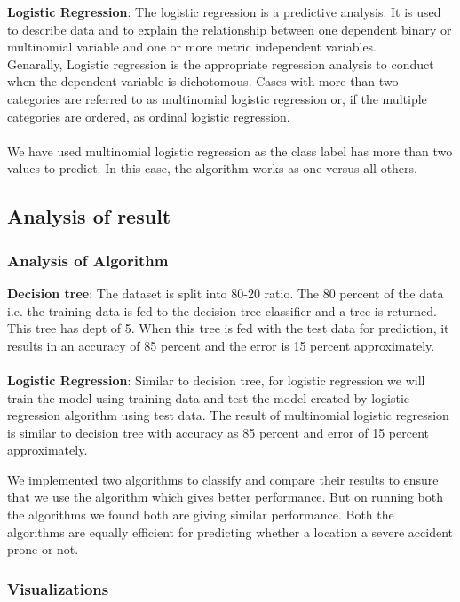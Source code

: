 \documentclass{acm_proc_article-sp}
\begin{document}
\textbf{Logistic Regression}: The logistic regression is a predictive analysis.  It is used to describe data and to explain the relationship between one dependent binary or multinomial variable and one or more metric independent variables.\\
Genarally, Logistic regression is the appropriate regression analysis to conduct when the dependent variable is dichotomous. Cases with more than two categories are referred to as multinomial logistic regression or, if the multiple categories are ordered, as ordinal logistic regression. \cite{logisticregression}\\
\\
We have used multinomial logistic regression as the class label has more than two values to predict. In this case, the algorithm works as one versus all others.

\subsection{Analysis of result}

\subsubsection{Analysis of Algorithm}

\textbf{Decision tree}: The dataset is split into 80-20 ratio. The 80 percent of the data i.e. the training data is fed to the decision tree classifier and a tree is returned. This tree has dept of 5. When this tree is fed with the test data for prediction, it results in an accuracy of 85 percent and the error is 15 percent approximately.
\\
\\
\textbf{Logistic Regression}: Similar to decision tree, for logistic regression we will train the model using training data and test the model created by logistic regression algorithm using test data. The result of multinomial logistic regression is similar to decision tree with accuracy as 85 percent and error of 15 percent approximately.

We implemented two algorithms to classify and compare their results to ensure that we use the algorithm which gives better performance. But on running both the algorithms we found both are giving similar performance. Both the algorithms are equally efficient for predicting whether a location a severe accident prone or not.

\subsubsection{Visualizations}
\end{document}
